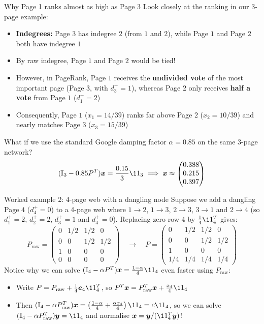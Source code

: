 \documentclass[aspectratio=169]{beamer}\usepackage[]{graphicx}\usepackage[]{xcolor}
\begin{document}
\begin{frame}{Why Page 1 ranks almost as high as Page 3}
Look closely at the ranking in our 3-page example:
\begin{itemize}
\item \textbf{Indegrees:} Page $3$ has indegree $2$ (from $1$ and $2$), while Page $1$ and Page $2$ both have indegree $1$
\item By raw indegree, Page $1$ and Page $2$ would be tied!
\item However, in PageRank, Page $1$ receives the \textbf{undivided vote} of the most important page (Page $3$, with $d_3^+ = 1$), whereas Page $2$ only receives \textbf{half a vote} from Page $1$ ($d_1^+ = 2$)
\item Consequently, Page $1$ ($x_1 = 14/39$) ranks far above Page $2$ ($x_2 = 10/39$) and nearly matches Page $3$ ($x_3 = 15/39$)
\end{itemize}
\vfill
What if we use the standard Google damping factor $\alpha = 0.85$ on the same 3-page network?
\[
(\II_3 - 0.85 P^T)\bx = \frac{0.15}{3}\11_3 \implies \bx \approx \begin{pmatrix} 0.388 \\ 0.215 \\ 0.397 \end{pmatrix}
\]
\end{frame}

\begin{frame}{Worked example 2: 4-page web with a dangling node}
Suppose we add a dangling Page $4$ ($d_4^+ = 0$) to a 4-page web where $1 \to 2$, $1 \to 3$, $2 \to 3$, $3 \to 1$ and $2 \to 4$ (so $d_1^+ = 2$, $d_2^+ = 2$, $d_3^+ = 1$ and $d_4^+ = 0$). Replacing zero row $4$ by $\frac{1}{4}\11_4^T$ gives:
\vfill
\[
P_{\text{raw}} = \begin{pmatrix}
0 & 1/2 & 1/2 & 0 \\
0 & 0 & 1/2 & 1/2 \\
1 & 0 & 0 & 0 \\
0 & 0 & 0 & 0
\end{pmatrix}
\quad \longrightarrow \quad
P = \begin{pmatrix}
0 & 1/2 & 1/2 & 0 \\
0 & 0 & 1/2 & 1/2 \\
1 & 0 & 0 & 0 \\
1/4 & 1/4 & 1/4 & 1/4
\end{pmatrix}
\]
\vfill
Notice why we can solve $(\II_4 - \alpha P^T)\bx = \frac{1-\alpha}{4}\11_4$ even faster using $P_{\text{raw}}$:
\begin{itemize}
\item Write $P = P_{\text{raw}} + \frac{1}{4}\be_4 \11_4^T$, so $P^T\bx = P_{\text{raw}}^T\bx + \frac{x_4}{4}\11_4$
\item Then $(\II_4 - \alpha P_{\text{raw}}^T)\bx = \left(\frac{1-\alpha}{4} + \frac{\alpha x_4}{4}\right)\11_4 = c \11_4$, so we can solve $(\II_4 - \alpha P_{\text{raw}}^T)\by = \11_4$ and normalise $\bx = \by / (\11_4^T \by)$!
\end{itemize}
\end{frame}
\end{document}
